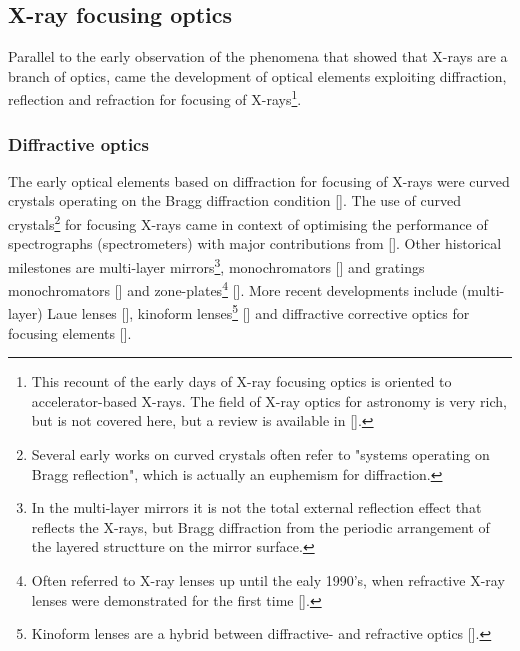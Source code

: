 \begin{refsection}
\subsection{X-ray focusing optics}

Parallel to the early observation of the phenomena that showed that X-rays are a branch of optics, came the development of optical elements exploiting diffraction, reflection and refraction for focusing of X-rays\footnote{This recount of the early days of X-ray focusing optics is oriented to accelerator-based X-rays. The field of X-ray optics for astronomy is very rich, but is not covered here, but a review is available in [\cite{Gorenstein2010}].}.

\subsubsection*{Diffractive optics}

The early optical elements based on diffraction for focusing of X-rays were curved crystals operating on the Bragg diffraction condition [\cite{Gouy1916,Seemann1916}]. The use of curved crystals\footnote{Several early works on curved crystals often refer to "systems operating on Bragg reflection", which is actually an euphemism for diffraction.} for focusing X-rays came in context of optimising the performance of spectrographs (spectrometers) with major contributions from [\cite{Johansson1933,V.Hamos1933, Hamos1937}]. Other historical milestones are multi-layer mirrors\footnote{In the multi-layer mirrors it is not the total external reflection effect that reflects the X-rays, but Bragg diffraction from the periodic arrangement of the layered structture on the mirror surface.}, monochromators [\cite{Smith1941}] and gratings monochromators [\cite{refMonoGrating}] and zone-plates\footnote{Often referred to X-ray lenses up until the ealy 1990's, when refractive X-ray lenses were demonstrated for the first time [\cite{Snigirev1996}].} [\cite{Baez1960,Schmahl1969,Kirz1974}]. More recent developments include (multi-layer) Laue lenses [\cite{refMLL}], kinoform lenses\footnote{Kinoform lenses are a hybrid between diffractive- and refractive optics [\cite{Jordan1970}].} [\cite{refKino}] and diffractive corrective optics for focusing elements [\cite{Probst2020}].



\end{refsection}
